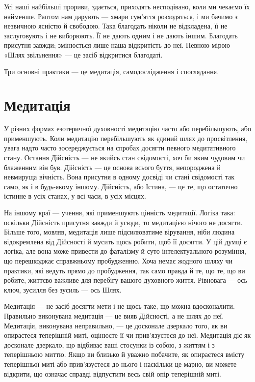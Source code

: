 Усі наші найбільші прориви, здається, приходять несподівано, коли ми чекаємо їх найменше. Раптом нам дарують — хмари сум'яття розходяться, і ми бачимо з незвичною ясністю й свободою. Така благодать ніколи не відкладена, її не заслуговують і не виборюють. Її не дають одним і не дають іншим. Благодать присутня завжди; змінюється лише наша відкритість до неї. Певною мірою «Шлях звільнення» — це засіб відкритися благодаті.

Три основні практики — це медитація, самодослідження і споглядання.

\section*{Медитація}

У різних формах езотеричної духовності медитацію часто або перебільшують, або применшують. Коли медитацію перебільшують як єдиний шлях до просвітлення, увага надто часто зосереджується на спробах досягти певного медитативного стану. Остання Дійсність — не якийсь стан свідомості, хоч би яким чудовим чи блаженним він був. Дійсність — це основа всього буття, непороджена й невмируща вічність. Вона присутня в одному досвіді чи стані свідомості так само, як і в будь-якому іншому. Дійсність, або Істина, — це те, що остаточно істинне в усіх станах, у всі часи, в усіх місцях.

На іншому краї — учення, які применшують цінність медитації. Логіка така: оскільки Дійсність присутня завжди й усюди, то медитацією нічого не досягти. Більше того, мовляв, медитація лише підсилюватиме вірування, ніби людина відокремлена від Дійсності й мусить щось робити, щоб її досягти. У цій думці є логіка, але вона може привести до фаталізму й суто інтелектуального розуміння, що перешкоджає справжньому пробудженню. Хоча немає жодного шляху чи практики, які ведуть прямо до пробудження, так само правда й те, що те, що ви робите, життєво важливе для перебігу вашого духовного життя. Рівновага — ось ключ, зусилля без зусиль — ось Шлях.

Медитація — не засіб досягти мети і не щось таке, що можна вдосконалити. Правильно виконувана медитація — це вияв Дійсності, а не шлях до неї. Медитація, виконувана неправильно, — це досконале дзеркало того, як ви опираєтеся теперішній миті, оцінюєте її чи прив'язуєтеся до неї. Медитація діє як досконале дзеркало, що відбиває ваші стосунки із собою, з життям і з теперішньою миттю. Якщо ви близько й уважно побачите, як опираєтеся вмісту теперішньої миті або прив'язуєтеся до нього і наскільки це марно, ви можете відкрити, що означає справді відпустити весь свій опір теперішній миті.

